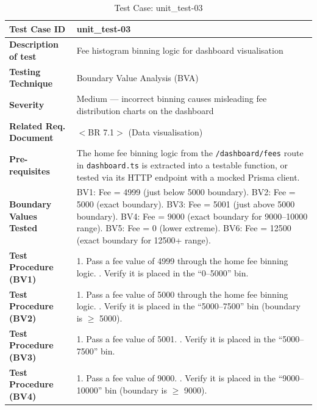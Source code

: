 \begin{table}[h!]
\centering
\caption{Test Case: unit\_test-03}
\begin{tabular}{|p{}|p{}|}
\hline
\textbf{Test Case ID} & unit\_test-03 \\ \hline
\textbf{Description of test} & Fee histogram binning logic for dashboard visualisation \\ \hline
\textbf{Testing Technique} & Boundary Value Analysis (BVA) \\ \hline
\textbf{Severity} & Medium --- incorrect binning causes misleading fee distribution charts on the dashboard \\ \hline
\textbf{Related Req. Document} & $<$BR 7.1$>$ (Data visualisation) \\ \hline
\textbf{Pre-requisites} & The home fee binning logic from the \texttt{/dashboard/fees} route in \texttt{dashboard.ts} is extracted into a testable function, or tested via its HTTP endpoint with a mocked Prisma client. \\ \hline
\textbf{Boundary Values Tested} & BV1: Fee = 4999 (just below 5000 boundary). \newline BV2: Fee = 5000 (exact boundary). \newline BV3: Fee = 5001 (just above 5000 boundary). \newline BV4: Fee = 9000 (exact boundary for 9000--10000 range). \newline BV5: Fee = 0 (lower extreme). \newline BV6: Fee = 12500 (exact boundary for 12500+ range). \\ \hline
\textbf{Test Procedure (BV1)} & 1. Pass a fee value of 4999 through the home fee binning logic. \newline 2. Verify it is placed in the ``0--5000'' bin. \\ \hline
\textbf{Test Procedure (BV2)} & 1. Pass a fee value of 5000 through the home fee binning logic. \newline 2. Verify it is placed in the ``5000--7500'' bin (boundary is $\geq$ 5000). \\ \hline
\textbf{Test Procedure (BV3)} & 1. Pass a fee value of 5001. \newline 2. Verify it is placed in the ``5000--7500'' bin. \\ \hline
\textbf{Test Procedure (BV4)} & 1. Pass a fee value of 9000. \newline 2. Verify it is placed in the ``9000--10000'' bin (boundary is $\geq$ 9000). \\ \hline

\end{tabular}
\end{table}
